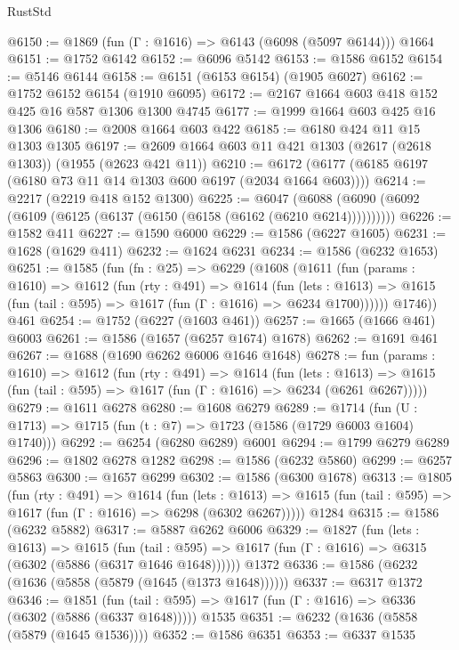 \begin{lexlean}{RustStd}
\begin{coremodule}
@6150 := @1869 (fun (Γ : @1616) => @6143 (@6098 (@5097 @6144))) @1664
@6151 := @1752 @6142
@6152 := @6096 @5142
@6153 := @1586 @6152
@6154 := @5146 @6144
@6158 := @6151 (@6153 @6154) (@1905 @6027)
@6162 := @1752 @6152 @6154 (@1910 @6095)
@6172 := @2167 @1664 @603 @418 @152 @425 @16 @587 @1306 @1300 @4745
@6177 := @1999 @1664 @603 @425 @16 @1306
@6180 := @2008 @1664 @603 @422
@6185 := @6180 @424 @11 @15 @1303 @1305
@6197 := @2609 @1664 @603 @11 @421 @1303 (@2617 (@2618 @1303)) (@1955 (@2623 @421 @11))
@6210 := @6172 (@6177 (@6185 @6197 (@6180 @73 @11 @14 @1303 @600 @6197 (@2034 @1664 @603))))
@6214 := @2217 (@2219 @418 @152 @1300)
@6225 := @6047 (@6088 (@6090 (@6092 (@6109 (@6125 (@6137 (@6150 (@6158 (@6162 (@6210 @6214))))))))))
@6226 := @1582 @411
@6227 := @1590 @6000
@6229 := @1586 (@6227 @1605)
@6231 := @1628 (@1629 @411)
@6232 := @1624 @6231
@6234 := @1586 (@6232 @1653)
@6251 := @1585
    (fun (fn : @25) =>
    @6229
      (@1608
        (@1611
          (fun (params : @1610) =>
          @1612
            (fun (rty : @491) =>
            @1614
              (fun (lets : @1613) =>
              @1615 (fun (tail : @595) => @1617 (fun (Γ : @1616) => @6234 @1700))))))
        @1746))
    @461
@6254 := @1752 (@6227 (@1603 @461))
@6257 := @1665 (@1666 @461) @6003
@6261 := @1586 (@1657 (@6257 @1674) @1678)
@6262 := @1691 @461
@6267 := @1688 (@1690 @6262 @6006 @1646 @1648)
@6278 := fun (params : @1610) =>
  @1612
    (fun (rty : @491) =>
    @1614
      (fun (lets : @1613) =>
      @1615 (fun (tail : @595) => @1617 (fun (Γ : @1616) => @6234 (@6261 @6267)))))
@6279 := @1611 @6278
@6280 := @1608 @6279
@6289 := @1714 (fun (U : @1713) => @1715 (fun (t : @7) => @1723 (@1586 (@1729 @6003 @1604) @1740)))
@6292 := @6254 (@6280 @6289) @6001
@6294 := @1799 @6279 @6289
@6296 := @1802 @6278 @1282
@6298 := @1586 (@6232 @5860)
@6299 := @6257 @5863
@6300 := @1657 @6299
@6302 := @1586 (@6300 @1678)
@6313 := @1805
    (fun (rty : @491) =>
    @1614
      (fun (lets : @1613) =>
      @1615 (fun (tail : @595) => @1617 (fun (Γ : @1616) => @6298 (@6302 @6267)))))
    @1284
@6315 := @1586 (@6232 @5882)
@6317 := @5887 @6262 @6006
@6329 := @1827
    (fun (lets : @1613) =>
    @1615
      (fun (tail : @595) => @1617 (fun (Γ : @1616) => @6315 (@6302 (@5886 (@6317 @1646 @1648))))))
    @1372
@6336 := @1586 (@6232 (@1636 (@5858 (@5879 (@1645 (@1373 @1648))))))
@6337 := @6317 @1372
@6346 := @1851
    (fun (tail : @595) => @1617 (fun (Γ : @1616) => @6336 (@6302 (@5886 (@6337 @1648)))))
    @1535
@6351 := @6232 (@1636 (@5858 (@5879 (@1645 @1536))))
@6352 := @1586 @6351
@6353 := @6337 @1535

\end{coremodule}
\end{lexlean}

